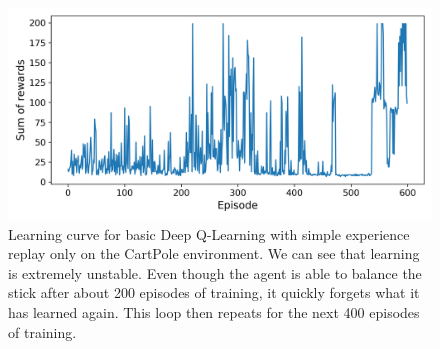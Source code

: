 \begin{figure}[t]
  
  \begin{center}
      \includegraphics[clip, width=0.8\columnwidth]{figures/rl/dqn_cart_pole_plot.png}
  \end{center}
  
  \caption[Learning Curve for Deep Q-Learning on CartPole]{Learning curve for basic Deep Q-Learning with simple experience replay only on the CartPole environment. We can see that learning is extremely unstable. Even though the agent is able to balance the stick after about 200 episodes of training, it quickly forgets what it has learned again. This loop then repeats for the next 400 episodes of training.}
  \label{fig:learning_curve_dqn}
\end{figure}

